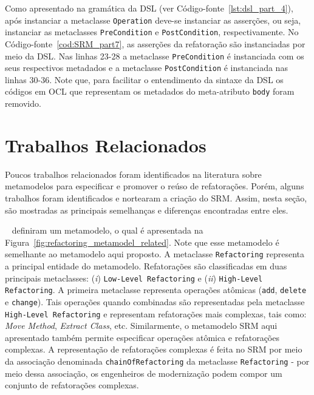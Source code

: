 Como apresentado na gramática da DSL (ver Código-fonte~\ref{lst:dsl_part_4}), após instanciar a metaclasse \texttt{Operation} deve-se instanciar as asserções, ou seja, instanciar as metaclasses \texttt{PreCondition} e \texttt{PostCondition}, respectivamente. No Código-fonte~\ref{cod:SRM_part7}, as asserções da refatoração são instanciadas por meio da DSL. Nas linhas 23-28 a metaclasse \texttt{PreCondition} é instanciada com os seus respectivos metadados e a metaclasse \texttt{PostCondition} é instanciada nas linhas 30-36. Note que, para facilitar o entendimento da sintaxe da DSL os códigos em OCL que representam os metadados do meta-atributo \texttt{body} foram removido. 


\section{Trabalhos Relacionados}\label{sec:trabalhos_relacionais_SRM}

Poucos trabalhos relacionados foram identificados na literatura sobre metamodelos para especificar e promover o reúso de refatorações. Porém, alguns trabalhos foram identificados e nortearam a criação do SRM. Assim, nesta seção, são mostradas as principais semelhanças e diferenças encontradas entre eles. 

~ definiram um metamodelo, o qual é apresentada na Figura~\ref{fig:refactoring_metamodel_related}. Note que esse metamodelo é semelhante ao metamodelo aqui proposto. A metaclasse \texttt{Refactoring} representa a principal entidade do metamodelo. Refatorações são classificadas em duas principais metaclasses: (\textit{i}) \texttt{Low-Level Refactoring} e (\textit{ii}) \texttt{High-Level Refactoring}. A primeira metaclasse representa operações atômicas (\texttt{add}, \texttt{delete} e \texttt{change}). Tais operações quando combinadas são representadas pela metaclasse \texttt{High-Level Refactoring} e representam refatorações mais complexas, tais como: \textit{Move Method}, \textit{Extract Class}, etc. Similarmente, o metamodelo SRM aqui apresentado também permite especificar operações atômica e refatorações complexas. A representação de refatorações complexas é feita no SRM por meio da associação denominada \texttt{chainOfRefactoring} da metaclasse \texttt{Refactoring} - por meio dessa associação, os engenheiros de modernização podem compor um conjunto de refatorações complexas.

